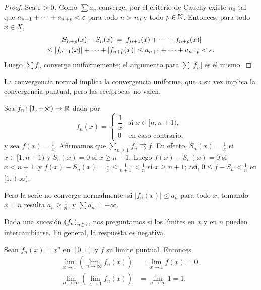 \begin{proof}
  Sea \(\varepsilon > 0\). Como \(\sum a_n\) converge, por el criterio de Cauchy existe \(n_0\) tal que \(a_{n+1} + \cdots + a_{n+p} < \varepsilon\) para todo \(n > n_0\) y todo \(p \in \mathbb{N}\). Entonces, para todo \(x \in X\),
  \begin{multline*}
    |S_{n+p}(x) - S_n(x)| = |f_{n+1}(x) + \cdots + f_{n+p}(x)| \\
    \leq |f_{n+1}(x)| + \cdots + |f_{n+p}(x)| \leq a_{n+1} + \cdots + a_{n+p} < \varepsilon.
  \end{multline*}
  Luego \(\sum f_n\) converge uniformemente; el argumento para \(\sum |f_n|\) es el mismo.
\end{proof}

La convergencia normal implica la convergencia uniforme, que a su vez implica la convergencia puntual, pero las recíprocas no valen.

\begin{eg}
  Sea \(f_n\colon [1, +\infty) \to \mathbb{R}\) dada por
  \[
    f_n(x) = \begin{cases}
      \dfrac{1}{x} & \text{si } x \in [n, n + 1), \\[1ex]
      0            & \text{en caso contrario,}
    \end{cases}
  \]
  y sea \(f(x) = \frac{1}{x}\). Afirmamos que \(\sum_{n \geq 1} f_n \rightrightarrows f\). En efecto, \(S_n(x) = \frac{1}{x}\) si \(x \in [1, n + 1)\) y \(S_n(x) = 0\) si \(x \geq n + 1\). Luego \(f(x) - S_n(x) = 0\) si \(x < n + 1\), y \(f(x) - S_n(x) = \frac{1}{x} \leq \frac{1}{n + 1} < \frac{1}{n}\) si \(x \geq n + 1\); así, \(0 \leq f - S_n < \frac{1}{n}\) en \([1, +\infty)\).

  Pero la serie no converge normalmente: si \(|f_n(x)| \leq a_n\) para todo \(x\), tomando \(x = n\) resulta \(a_n \geq \frac{1}{n}\), y \(\sum a_n = +\infty\).
\end{eg}

\begin{note}
  Dada una sucesión \({(f_n)}_{n \in \mathbb{N}}\), nos preguntamos si los límites en \(x\) y en \(n\) pueden intercambiarse. En general, la respuesta es negativa.
\end{note}

\begin{eg}
  Sean \(f_n(x) = x^n\) en \([0, 1]\) y \(f\) su límite puntual. Entonces
  \begin{align*}
    \lim_{x \to 1} \left( \lim_{n \to \infty} f_n(x) \right) & = \lim_{x \to 1} f(x) = 0, \\
    \lim_{n \to \infty} \left( \lim_{x \to 1} f_n(x) \right) & = \lim_{n \to \infty} 1 = 1.
  \end{align*}
\end{eg}

